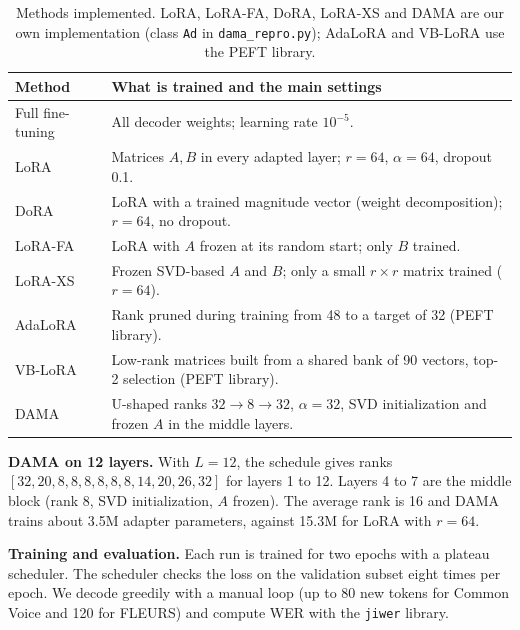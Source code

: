\documentclass[11pt,a4paper]{article}
\begin{document}
\begin{table}[H]\centering\small
\begin{tabular}{p{2.6cm}p{12cm}}\toprule
\textbf{Method} & \textbf{What is trained and the main settings}\\\midrule
Full fine-tuning & All decoder weights; learning rate $10^{-5}$.\\
LoRA & Matrices $A,B$ in every adapted layer; $r=64$, $\alpha=64$, dropout 0.1.\\
DoRA & LoRA with a trained magnitude vector (weight decomposition); $r=64$, no dropout.\\
LoRA-FA & LoRA with $A$ frozen at its random start; only $B$ trained.\\
LoRA-XS & Frozen SVD-based $A$ and $B$; only a small $r\times r$ matrix trained ($r=64$).\\
AdaLoRA & Rank pruned during training from 48 to a target of 32 (PEFT library).\\
VB-LoRA & Low-rank matrices built from a shared bank of 90 vectors, top-2 selection (PEFT library).\\
DAMA & U-shaped ranks $32\to8\to32$, $\alpha=32$, SVD initialization and frozen $A$ in the middle layers.\\\bottomrule
\end{tabular}
\caption{Methods implemented. LoRA, LoRA-FA, DoRA, LoRA-XS and DAMA are our own implementation (class \texttt{Ad} in \texttt{dama\_repro.py}); AdaLoRA and VB-LoRA use the PEFT library.}
\end{table}

\textbf{DAMA on 12 layers.} With $L=12$, the schedule gives ranks $[32,20,8,8,8,8,8,8,14,20,26,32]$ for layers 1 to 12. Layers 4 to 7 are the middle block (rank 8, SVD initialization, $A$ frozen). The average rank is 16 and DAMA trains about 3.5M adapter parameters, against 15.3M for LoRA with $r=64$.

\textbf{Training and evaluation.} Each run is trained for two epochs with a plateau scheduler. The scheduler checks the loss on the validation subset eight times per epoch. We decode greedily with a manual loop (up to 80 new tokens for Common Voice and 120 for FLEURS) and compute WER with the \texttt{jiwer} library.

\end{document}
